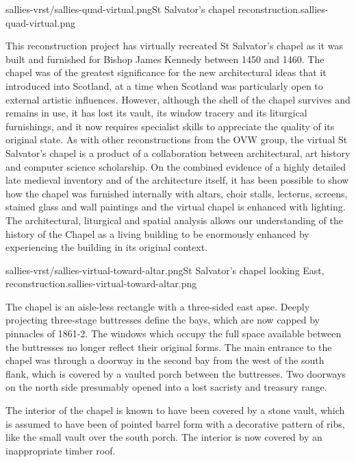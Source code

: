        {sallies-vrst/sallies-quad-virtual.png}{St Salvator's chapel reconstruction.}{sallies-quad-virtual.png}
       
This reconstruction project has virtually recreated St Salvator’s chapel as it was built and furnished for Bishop James Kennedy between 1450 and 1460. The chapel was of the greatest significance for the new architectural ideas that it introduced into Scotland, at a time when Scotland was particularly open to external artistic influences. However, although the shell of the chapel survives and remains in use, it has lost its vault, its window tracery and its liturgical furnishings, and it now requires specialist skills to appreciate the quality of its original state. As with other reconstructions from the OVW group, the virtual St Salvator's chapel is a product of a collaboration between architectural, art history and computer science scholarship. On the combined evidence of a highly detailed late medieval inventory and of the architecture itself, it has been possible to show how the chapel was furnished internally with altars, choir stalls, lecterns, screens, stained glass and wall paintings and the virtual chapel is enhanced with lighting. The architectural, liturgical and spatial analysis allows our understanding of the history of the Chapel as a living building to be enormously enhanced by experiencing the building in its original context.

       {sallies-vrst/sallies-virtual-toward-altar.png}{St Salvator's chapel looking East, reconstruction.}{sallies-virtual-toward-altar.png}

The chapel is an aisle-less rectangle with a three-sided east apse. Deeply projecting three-stage buttresses define the bays, which are now capped by pinnacles of 1861-2. The windows which occupy the full space available between the buttresses no longer reflect their original forms. The main entrance to the chapel was through a doorway in the second bay from the west of the south flank, which is covered by a vaulted porch between the buttresses. Two doorways on the north side presumably opened into a lost sacristy and treasury range.

The interior of the chapel is known to have been covered by a stone vault, which is assumed to have been of pointed barrel form with a decorative pattern of ribs, like the small vault over the south porch. The interior is now covered by an inappropriate timber roof.

